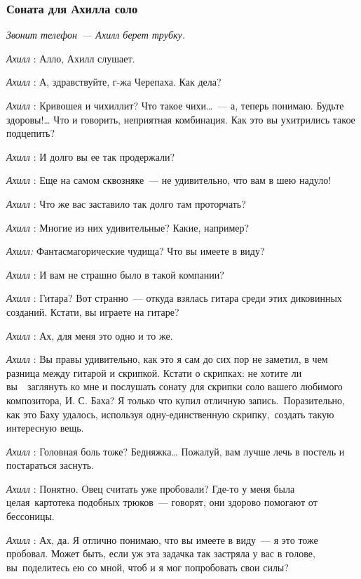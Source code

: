 \subsubsection{Соната для Ахилла соло}

\emph{Звонит телефон~--- Ахилл берет трубку.}

\emph{Ахилл} : Алло, Ахилл слушает.

\emph{Ахилл} : А, здравствуйте, г-жа Черепаха. Как дела?

\emph{Ахилл} : Кривошея и чихиллит? Что такое чихи\ldots~--- а, теперь понимаю. Будьте здоровы!\ldots{} Что и говорить, неприятная комбинация. Как это вы ухитрились такое подцепить?

\emph{Ахилл} : И долго вы ее так продержали?

\emph{Ахилл} : Еще на самом сквозняке~--- не удивительно, что вам в шею надуло!

\emph{Ахилл} : Что же вас заставило так долго там проторчать?

\emph{Ахилл} : Многие из них удивительные? Какие, например?

\emph{Ахилл:} Фантасмагорические чудища? Что вы имеете в виду?

\emph{Ахилл} : И вам не страшно было в такой компании?

\emph{Ахилл} : Гитара? Вот странно~--- откуда взялась гитара среди этих диковинных созданий. Кстати, вы играете на гитаре?

\emph{Ахилл} : Ах, для меня это одно и то же.

\emph{Ахилл} : Вы правы удивительно, как это я сам до сих пор не заметил, в чем разница между гитарой и скрипкой. Кстати о скрипках: не хотите ли вы~~заглянуть ко мне и послушать сонату для скрипки соло вашего любимого композитора, И. С. Баха? Я только что купил отличную запись.~Поразительно, как это Баху удалось, используя одну-единственную скрипку,~создать такую интересную вещь.

\emph{Ахилл} : Головная боль тоже? Бедняжка\ldots{} Пожалуй, вам лучше лечь в постель и постараться заснуть.

\emph{Ахилл} : Понятно. Овец считать уже пробовали? Где-то у меня была целая~картотека подобных трюков~--- говорят, они здорово помогают от бессоницы.

\emph{Ахилл} : Ах, да. Я отлично понимаю, что вы имеете в виду~--- я это тоже пробовал. Может быть, если уж эта задачка так застряла у вас в голове, вы~поделитесь ею со мной, чтоб и я мог попробовать свои силы?


